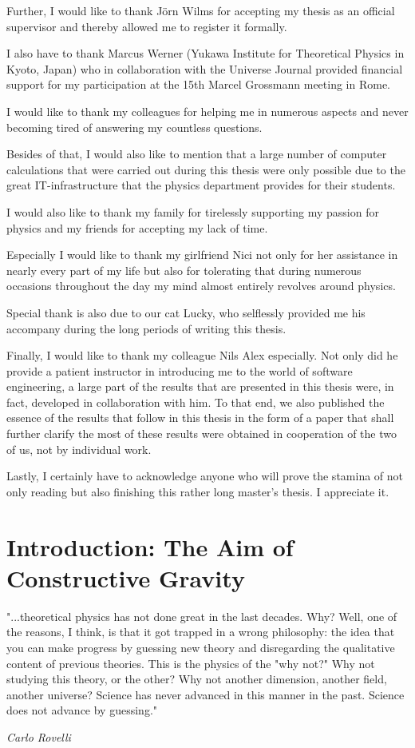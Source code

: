 \documentclass[a4paper,12pt, DIV=14, BCOR=5mm, twoside, headsepline, numbers=noenddot]{scrbook}
\begin{document}
Further, I would like to thank Jörn Wilms for accepting my thesis as an official supervisor
and thereby allowed me to register it formally. 

I also have to thank Marcus Werner (Yukawa Institute for Theoretical Physics in Kyoto, Japan) who in collaboration with the Universe Journal provided financial support for my participation at the 15th Marcel Grossmann meeting in Rome. 

I would like to thank my colleagues for helping me in numerous aspects and never becoming tired of answering my countless questions.

Besides of that, I would also like to mention that a large number of computer calculations that were carried out during this thesis were only possible due to the great IT-infrastructure that the physics department provides for their students. 

I would also like to thank my family for tirelessly supporting my passion for physics and my friends for accepting my lack of time.

Especially I would like to thank my girlfriend Nici not only for her assistance in nearly every part of my life but also
for tolerating that during numerous occasions throughout the day my mind almost entirely revolves around physics. 

Special thank is also due to our cat Lucky, who selflessly provided me his accompany during the long periods of writing this thesis. 

Finally, I would like to thank my colleague Nils Alex especially.
Not only did he provide a patient instructor in introducing me to the world of software engineering, 
a large part of the results that are presented in this thesis were, in fact, developed in collaboration with him. 
To that end, we also published the essence of the results that follow in this thesis in the form of a paper \cite{ToBePublished} that shall further clarify the most of these results were obtained in cooperation of the two of us, not by individual work. 

Lastly, I certainly have to acknowledge anyone who will prove the stamina of not only reading but also finishing this rather long master's thesis. I appreciate it. 

\chapter{Introduction: The Aim of Constructive Gravity}
\setlength{\epigraphwidth}{0.6\textwidth}
\epigraph{"...theoretical physics has not done great in the last decades. Why? Well, one of the reasons, I think, is that it got trapped in a wrong philosophy: the idea that you can make progress by guessing new theory and disregarding the qualitative content of previous theories. This is the physics of the "why not?" Why not studying this theory, or the other? Why not another dimension, another field, another universe? Science has never advanced in this manner in the past. Science does not advance by guessing."}{\textit{Carlo Rovelli}}
\end{document}
